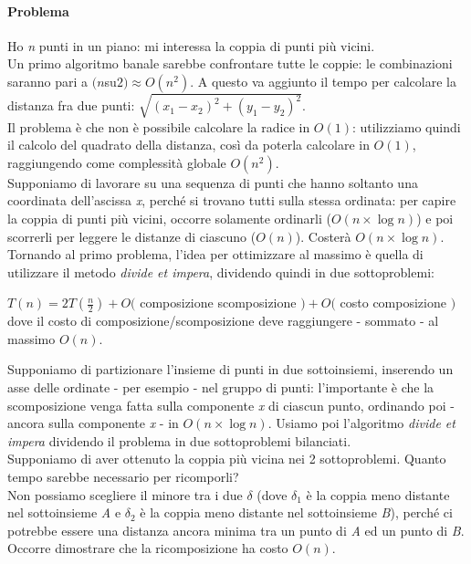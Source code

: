 \paragraph{Problema}
Ho \textit{n} punti in un piano: mi interessa la coppia di punti più vicini. \\
Un primo algoritmo banale sarebbe confrontare tutte le coppie: le combinazioni saranno pari a $(n$su$2) \approx O(n^2)$. A questo va aggiunto il tempo per calcolare la distanza fra due punti: $\sqrt{(x_1 - x_2)^2 + (y_1 - y_2)^2}$. \\
Il problema è che non è possibile calcolare la radice in $O(1)$: utilizziamo quindi il calcolo del quadrato della distanza, così da poterla calcolare in $O(1)$, raggiungendo come complessità globale $O(n^2)$. \\
Supponiamo di lavorare su una sequenza di punti che hanno soltanto una coordinata dell'ascissa \textit{x}, perché si trovano tutti sulla stessa ordinata: per capire la coppia di punti più vicini, occorre solamente ordinarli ($O(n \times \log{n})$) e poi scorrerli per leggere le distanze di ciascuno ($O(n)$). Costerà $O(n \times \log{n})$. \\
Tornando al primo problema, l'idea per ottimizzare al massimo è quella di utilizzare il metodo \textit{divide et impera}, dividendo quindi in due sottoproblemi:
\begin{center}
	$T(n) = 2T(\frac{n}{2}) + O($ composizione scomposizione $) + O($ costo composizione $)$ \\
	dove il costo di composizione/scomposizione deve raggiungere - sommato - al massimo $O(n)$.
\end{center}
Supponiamo di partizionare l'insieme di punti in due sottoinsiemi, inserendo un asse delle ordinate - per esempio - nel gruppo di punti: l'importante è che la scomposizione venga fatta sulla componente \textit{x} di ciascun punto, ordinando poi - ancora sulla componente \textit{x} - in $O(n \times \log{n})$. Usiamo poi l'algoritmo \textit{divide et impera} dividendo il problema in due sottoproblemi bilanciati. \\
Supponiamo di aver ottenuto la coppia più vicina nei 2 sottoproblemi. Quanto tempo sarebbe necessario per ricomporli? \\
Non possiamo scegliere il minore tra i due $\delta$ (dove $\delta_1$ è la coppia meno distante nel sottoinsieme \textit{A} e $\delta_2$ è la coppia meno distante nel sottoinsieme \textit{B}), perché ci potrebbe essere una distanza ancora minima tra un punto di \textit{A} ed un punto di \textit{B}.\\
Occorre dimostrare che la ricomposizione ha costo $ O(n) $.

